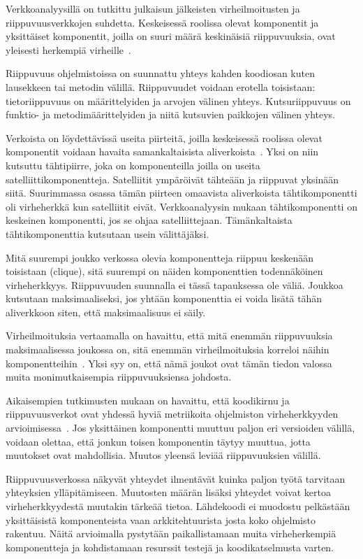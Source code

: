 \documentclass[finnish]{../tktltiki2}
\theoremstyle{definition}
\theoremstyle{remark}
\begin{document}
    Verkkoanalyysillä on tutkittu julkaisun jälkeisten virheilmoitusten ja riippuvuusverkkojen suhdetta. Keskeisessä 
roolissa olevat komponentit ja yksittäiset komponentit, joilla on suuri määrä keskinäisiä riippuvuuksia, ovat 
yleisesti herkempiä virheille~\cite{ZN08}.

    Riippuvuus ohjelmistoissa on suunnattu yhteys kahden koodiosan kuten lausekkeen tai metodin välillä. Riippuvuudet 
voidaan erotella toisistaan: tietoriippuvuus on määrittelyiden ja arvojen välinen yhteys. Kutsuriippuvuus on funktio- ja 
metodimäärittelyiden ja niitä kutsuvien paikkojen välinen yhteys.

    Verkoista on löydettävissä useita piirteitä, joilla keskeisessä roolissa olevat komponentit voidaan havaita 
samankaltaisista aliverkoista~\cite{ZN08}. Yksi on niin kutsuttu tähtipiirre, joka on komponenteilla joilla on useita 
satelliittikomponentteja. Satelliitit ympäröivät tähteään ja riippuvat yksinään siitä. Suurimmassa osassa tämän piirteen 
omaavista aliverkoista tähtikomponentti oli virheherkkä kun satelliitit eivät. Verkkoanalyysin mukaan tähtikomponentti 
on keskeinen komponentti, jos se ohjaa satelliittejaan. Tämänkaltaista tähtikomponenttia kutsutaan usein välittäjäksi.

    Mitä suurempi joukko verkossa olevia komponentteja riippuu keskenään toisistaan (clique), sitä suurempi on näiden 
komponenttien todennäköinen virheherkkyys. Riippuvuuden suunnalla ei tässä tapauksessa ole väliä. Joukkoa kutsutaan 
maksimaaliseksi, jos yhtään komponenttia ei voida lisätä tähän aliverkkoon siten, että maksimaalisuus ei säily.

    Virheilmoituksia vertaamalla on havaittu, että mitä enemmän riippuvuuksia maksimaalisessa joukossa on, sitä enemmän 
virheilmoituksia korreloi näihin komponentteihin~\cite{ZN08}. Yksi syy on, että nämä joukot ovat tämän tiedon valossa 
muita monimutkaisempia riippuvuuksiensa johdosta.

    Aikaisempien tutkimusten mukaan on havaittu, että koodikirnu ja riippuvuusverkot ovat yhdessä hyviä metriikoita 
ohjelmiston virheherkkyyden arvioimisessa~\cite{NB07}. Jos yksittäinen komponentti muuttuu paljon eri versioiden 
välillä, voidaan olettaa, että jonkun toisen komponentin täytyy muuttua, jotta muutokset ovat mahdollisia. Muutos 
yleensä leviää riippuvuuksien välillä.

    Riippuvuusverkossa näkyvät yhteydet ilmentävät kuinka paljon työtä tarvitaan yhteyksien ylläpitämiseen. Muutosten 
määrän lisäksi yhteydet voivat kertoa virheherkkyydestä muutakin tärkeää tietoa. Lähdekoodi ei muodostu pelkästään 
yksittäisistä komponenteista vaan arkkitehtuurista josta koko ohjelmisto rakentuu. Näitä arvioimalla pystytään 
paikallistamaan muita virheherkempiä komponentteja ja kohdistamaan resurssit testejä ja koodikatselmusta varten.
\end{document}
